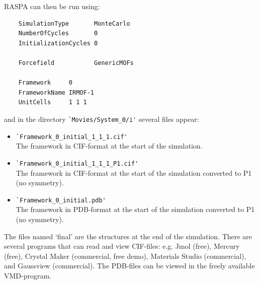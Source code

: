 RASPA can then be run using:
\begin{verbatim}
    SimulationType       MonteCarlo
    NumberOfCycles       0
    InitializationCycles 0

    Forcefield           GenericMOFs

    Framework     0
    FrameworkName IRMOF-1
    UnitCells     1 1 1
\end{verbatim}
and in the directory \verb=`Movies/System_0/i'= several files appear: 
\begin{itemize}
\item{\verb=`Framework_0_initial_1_1_1.cif'=}\\
The framework in CIF-format at the start of the simulation.
\item{\verb=`Framework_0_initial_1_1_1_P1.cif'=}\\
The framework in CIF-format at the start of the simulation converted to P1 (no symmetry).
\item{\verb=`Framework_0_initial.pdb'=}\\
The framework in PDB-format at the start of the simulation converted to P1 (no symmetry).
\end{itemize}
The files named `final' are the structures at the end of the simulation. There are several programs that can read and view CIF-files:
e.g. Jmol (free), Mercury (free), Crystal Maker (commercial, free demo), Materials Studio (commercial), and Gaussview (commercial).
The PDB-files can be viewed in the freely available VMD-program.
\begin{center}
\end{center}


